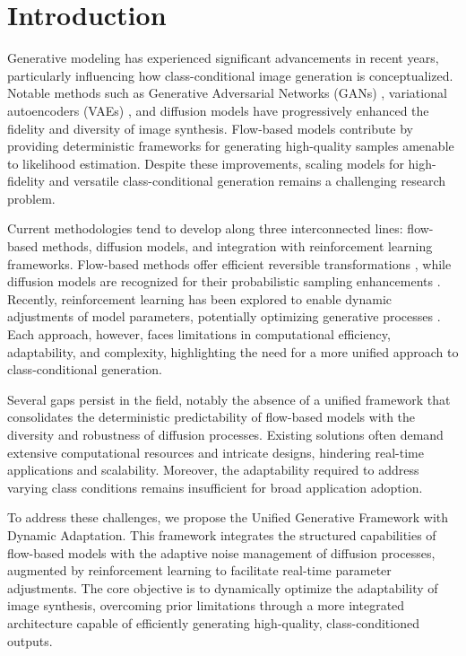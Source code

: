 \section{Introduction}

Generative modeling has experienced significant advancements in recent years, particularly influencing how class-conditional image generation is conceptualized. Notable methods such as Generative Adversarial Networks (GANs) \cite{goodfellow2014generative}, variational autoencoders (VAEs) \cite{kingma2013auto}, and diffusion models \cite{ho2020denoising} have progressively enhanced the fidelity and diversity of image synthesis. Flow-based models \cite{dinh2016density,kingma2018glow} contribute by providing deterministic frameworks for generating high-quality samples amenable to likelihood estimation. Despite these improvements, scaling models for high-fidelity and versatile class-conditional generation remains a challenging research problem.

Current methodologies tend to develop along three interconnected lines: flow-based methods, diffusion models, and integration with reinforcement learning frameworks. Flow-based methods offer efficient reversible transformations \cite{dinh2016density}, while diffusion models are recognized for their probabilistic sampling enhancements \cite{ho2020denoising}. Recently, reinforcement learning has been explored to enable dynamic adjustments of model parameters, potentially optimizing generative processes \cite{ren2023reinforcement}. Each approach, however, faces limitations in computational efficiency, adaptability, and complexity, highlighting the need for a more unified approach to class-conditional generation.

Several gaps persist in the field, notably the absence of a unified framework that consolidates the deterministic predictability of flow-based models with the diversity and robustness of diffusion processes. Existing solutions often demand extensive computational resources and intricate designs, hindering real-time applications and scalability. Moreover, the adaptability required to address varying class conditions remains insufficient for broad application adoption.

To address these challenges, we propose the Unified Generative Framework with Dynamic Adaptation. This framework integrates the structured capabilities of flow-based models with the adaptive noise management of diffusion processes, augmented by reinforcement learning to facilitate real-time parameter adjustments. The core objective is to dynamically optimize the adaptability of image synthesis, overcoming prior limitations through a more integrated architecture capable of efficiently generating high-quality, class-conditioned outputs.

